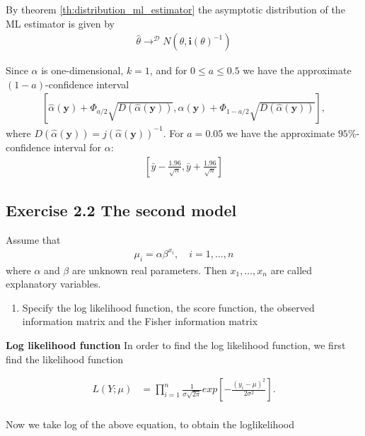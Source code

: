 By theorem \ref{th:distribution_ml_estimator} the asymptotic distribution of the ML estimator is given by
\begin{align*}
    \hat{\theta} \rightarrow^\mathcal{D} N\left( \theta, \boldsymbol{i}(\theta)^{-1} \right)
\end{align*}

Since $\alpha$ is one-dimensional, $k=1$, and for $0\leq a \leq 0.5$ we have the approximate $(1-a)$-confidence interval
\begin{align*}
\left[ \hat{\alpha}(\mathbf{y}) + \Phi_{a/2} \sqrt{D\left( \hat{\alpha}\left(\mathbf{y}\right)\right)}, \hat{\alpha}(\mathbf{y}) + \Phi_{1 - a/2} \sqrt{D\left( \hat{\alpha}\left(\mathbf{y}\right)\right)} \right],
\end{align*}
where $D\left(\hat{\alpha}(\mathbf{y})\right) = j\left(\hat{\alpha}(\mathbf{y})\right)^{-1}$.
For $a=0.05$ we have the approximate $95\%$-confidence interval for $\alpha$:
\begin{align*}
\left[ \bar{y} - \frac{1.96}{\sqrt{n}}, \bar{y} + \frac{1.96}{\sqrt{n}} \right]    
\end{align*}

\subsection*{Exercise 2.2 The second model}

Assume that
\begin{align*}
    \mu_i=\alpha \beta^{x_i}, \quad i=1,\ldots, n
\end{align*}
where $\alpha$ and $\beta$ are unknown real parameters. Then $x_1, \ldots,x_n$ are called explanatory variables. 

\begin{enumerate}
    \item Specify the log likelihood function, the score function, the observed information matrix and the Fisher information matrix
\end{enumerate}

\textbf{Log likelihood function}
In order to find the log likelihood function, we first find the likelihood function

\begin{align*}
   L(Y;\mu) &= \prod_{i=1}^n \frac{1}{\sigma \sqrt{2 \pi}}exp\left[-\frac{(y_i -\mu)^2}{2 \sigma^2}\right].\\
\end{align*}

Now we take log of the above equation, to obtain the loglikelihood

